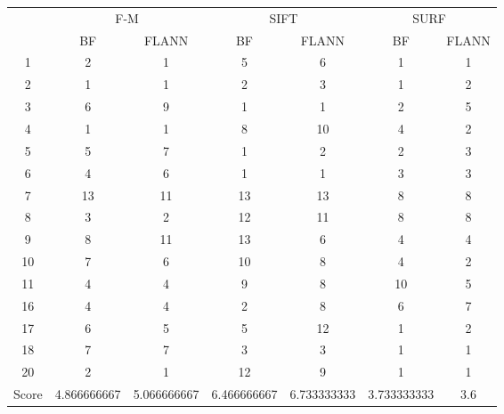 \documentclass[draft,final]{vutinfth} %
\begin{document}
\begin{minipage}{\linewidth}
\centering
\begin{tabular}{ccccccc}
\multirow{2}{*}{ } & \multicolumn{2}{c}{ F-M } & \multicolumn{2}{c}{ SIFT } & \multicolumn{2}{c}{ SURF } \\
& BF & FLANN & BF & FLANN & BF & FLANN \\
1 & 2 & 1 & 5 & 6 & 1 & 1 \\
2 & 1 & 1 & 2 & 3 & 1 & 2 \\
3 & 6 & 9 & 1 & 1 & 2 & 5 \\
4 & 1 & 1 & 8 & 10 & 4 & 2 \\
5 & 5 & 7 & 1 & 2 & 2 & 3 \\
6 & 4 & 6 & 1 & 1 & 3 & 3 \\
7 & 13 & 11 & 13 & 13 & 8 & 8 \\
8 & 3 & 2 & 12 & 11 & 8 & 8 \\
9 & 8 & 11 & 13 & 6 & 4 & 4 \\
10 & 7 & 6 & 10 & 8 & 4 & 2 \\
11 & 4 & 4 & 9 & 8 & 10 & 5 \\
16 & 4 & 4 & 2 & 8 & 6 & 7 \\
17 & 6 & 5 & 5 & 12 & 1 & 2 \\
18 & 7 & 7 & 3 & 3 & 1 & 1 \\
20 & 2 & 1 & 12 & 9 & 1 & 1 \\
Score & 4.866666667 & 5.066666667 & 6.466666667 & 6.733333333 & 3.733333333 & 3.6 \\
\end{tabular}
 \label{tab:25Cent} 
\end{minipage}
\end{document}

